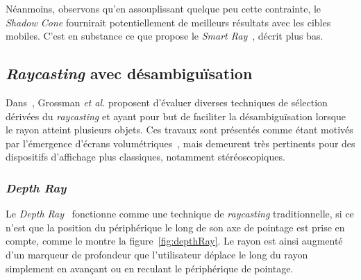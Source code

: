 	Néanmoins, observons qu'en assouplissant quelque peu cette contrainte, le \emph{Shadow Cone} fournirait potentiellement de meilleurs résultats avec les cibles mobiles. C'est en substance ce que propose le \emph{Smart Ray}~\cite{grossman2006design}, décrit plus bas.

	\subsection{\emph{Raycasting} avec désambiguïsation}
	Dans~\cite{grossman2006design}, Grossman \emph{et al.} proposent d'évaluer diverses techniques de sélection dérivées du \emph{raycasting} et ayant pour but de faciliter la désambiguïsation lorsque le rayon atteint plusieurs objets. Ces travaux sont présentés comme étant motivés par l'émergence d'écrans volumétriques\footnotemark{}~\cite{ebert1999realizing}, mais demeurent très pertinents pour des dispositifs d'affichage plus classiques, notamment stéréoscopiques.
	

	\subsubsection{\emph{Depth Ray}}
	Le \emph{Depth Ray}~\cite{grossman2006design} fonctionne comme une technique de \emph{raycasting} traditionnelle, si ce n'est que la position du périphérique le long de son axe de pointage est prise en compte, comme le montre la figure~\ref{fig:depthRay}. Le rayon est ainsi augmenté d'un marqueur de profondeur que l'utilisateur déplace le long du rayon simplement en avançant ou en reculant le périphérique de pointage.
	
